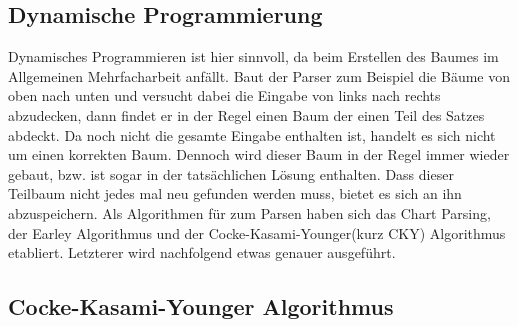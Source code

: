 \subsection{Dynamische Programmierung}
\label{sec:nlp:syn-parsen:dyn-progr}

Dynamisches Programmieren ist hier sinnvoll, da beim Erstellen des Baumes im Allgemeinen Mehrfacharbeit anfällt. Baut der Parser zum Beispiel die Bäume von oben nach unten und versucht dabei die Eingabe von links nach rechts abzudecken, dann findet er in der Regel einen Baum der einen Teil des Satzes abdeckt. Da noch nicht die gesamte Eingabe enthalten ist, handelt es sich nicht um einen korrekten Baum. Dennoch wird dieser Baum in der Regel immer wieder gebaut, bzw. ist sogar in der tatsächlichen Lösung enthalten. Dass dieser Teilbaum nicht jedes mal neu gefunden werden muss, bietet es sich an ihn abzuspeichern. Als Algorithmen für zum Parsen haben sich das Chart Parsing, der Earley Algorithmus und der Cocke-Kasami-Younger(kurz CKY) Algorithmus etabliert. Letzterer wird nachfolgend etwas genauer ausgeführt. 

\subsection{Cocke-Kasami-Younger Algorithmus}
\label{sec:nlp:syn-parsen:cky}

